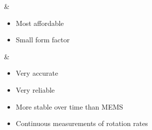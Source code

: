 \documentclass[conference]{IEEEtran}
\begin{document}
\begin{table}[htbp]
\begin{tabular}
             & \begin{itemize}
                                \item Most affordable
                                \item Small form factor
                            \end{itemize}
                        & \begin{itemize}
                            \item Very accurate
                            \item Very reliable
                            \item More stable over time than MEMS
                            \item Continuous measurements of rotation rates
                        \end{itemize}
                        

\end{tabular}
\end{table}
\end{document}

